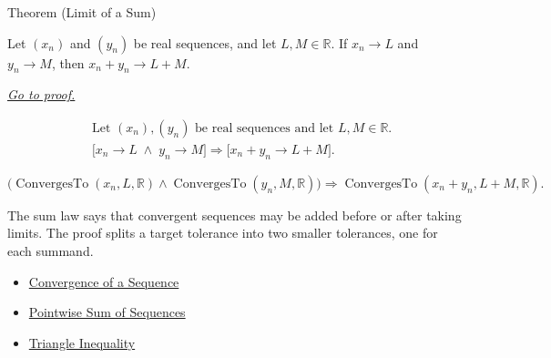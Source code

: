 
\begin{theorembox}{Theorem (Limit of a Sum)}
\begin{theorem}
\label{thm:limit-of-a-sum}
Let $(x_n)$ and $(y_n)$ be real sequences, and let $L,M\in\mathbb{R}$.
If $x_n\to L$ and $y_n\to M$, then $x_n+y_n\to L+M$.

\smallskip
\noindent
\hyperref[prf:limit-of-a-sum]{\textit{Go to proof.}}
\end{theorem}
\end{theorembox}

\begin{remark*}
\[
\begin{aligned}
&\text{Let } (x_n),(y_n) \text{ be real sequences and let } L,M\in\mathbb{R}.\\
&\bigl[
x_n\to L \;\land\; y_n\to M
\bigr]
\Longrightarrow
\bigl[
x_n+y_n\to L+M
\bigr].
\end{aligned}
\]
\end{remark*}

\begin{remark*}
\[
\bigl(
\operatorname{ConvergesTo}(x_n,L,\mathbb{R})
\land
\operatorname{ConvergesTo}(y_n,M,\mathbb{R})
\bigr)
\Longrightarrow
\operatorname{ConvergesTo}(x_n+y_n,L+M,\mathbb{R}).
\]
\end{remark*}

\begin{remark*}[Interpretation]
The sum law says that convergent sequences may be added before or after
taking limits. The proof splits a target tolerance into two smaller tolerances,
one for each summand.
\end{remark*}

\begin{dependencies}
\begin{itemize}
  \item \hyperref[def:convergent-sequence]{Convergence of a Sequence}
  \item \hyperref[def:pointwise-sum-sequence]{Pointwise Sum of Sequences}
  \item \hyperref[thm:triangle-inequality]{Triangle Inequality}
\end{itemize}
\end{dependencies}


